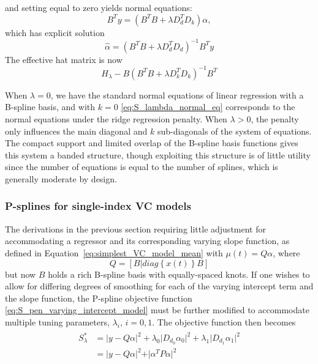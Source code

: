 \documentclass[12pt]{article}
\theoremstyle{definition}
\begin{document}
and setting equal to zero yields normal equations:
\begin{equation}\label{eq:S_lambda_normal_eq}
B^T y = \left(B^T B +  \lambda D_d^TD_k\right)\alpha,
\end{equation}
which has explicit solution
\[
\hat{\alpha} = \left(B^T B +  \lambda D_d^TD_d\right)^{-1}B^T y
\]
\noindent
The effective hat matrix is now
\[
H_\lambda - B\left(B^T B +  \lambda D_k^TD_k\right)^{-1}B^T 
\]

When $\lambda = 0$, we have the standard normal equations of linear regression with a B-spline basis, and with $k = 0$ \ref{eq:S_lambda_normal_eq} corresponds to the normal equations under the ridge regression penalty. When $\lambda > 0$, the penalty only influences the main diagonal and $k$ sub-diagonals of the system of equations. The compact support and limited overlap of the B-spline basis functions gives this system a banded structure, though exploiting this structure is of little utility since the number of equations is equal to the number of splines, which is generally moderate by design. 



\subsubsection{P-splines for single-index VC models}

The derivations in the previous section requiring little adjustment for accommodating a regressor and its corresponding varying slope function, as defined in Equation~\ref{eq:simplest_VC_model_mean} with $\mu\left(t\right) =  Q\alpha$, where 
\[
Q = \left[B | diag\left\{x\left(t\right) \right\}B \right]
\]
but now $B$ holds a rich B-spline basis with equally-spaced knots. If one wishes to allow for differing degrees of smoothing for each of the varying intercept term and the slope function, the P-spline objective function \ref{eq:S_pen_varying_intercept_model} must be further modified to accommodate multiple tuning parameters, $\lambda_i$, $i=0,1$. The objective function then becomes
\begin{align} 
\begin{split}
S^*_\lambda &= \vert y- Q\alpha  \vert^2  + \lambda_0 \vert D_{d_0} \alpha_0 \vert^2 + \lambda_1 \vert D_{d_1} \alpha_1 \vert^2\\
	&= \vert y- Q\alpha  \vert^2  + \vert \alpha^T P \alpha \vert^2
\end{split} \label{eq:S_pen_star}
\end{align}
\end{document}
